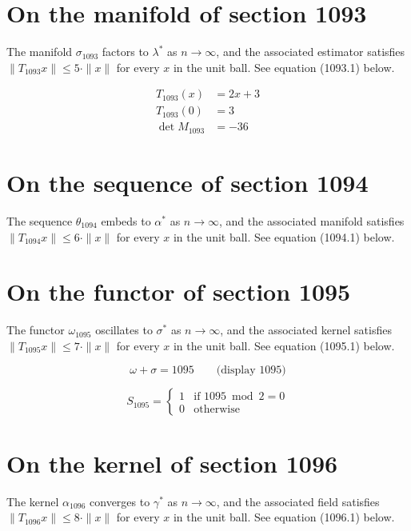 \documentclass{article}
\begin{document}
\section{On the manifold of section 1093}
The manifold $\sigma_{1093}$ factors to $\lambda^{*}$ as $n \to \infty$,
and the associated estimator satisfies $\|T_{1093} x\| \leq 5 \cdot \|x\|$
for every $x$ in the unit ball. See equation (1093.1) below.

\begin{align}
T_{1093}(x) &= 2 x + 3 \\
T_{1093}(0) &= 3 \\
\det M_{1093} &= -36
\end{align}

\section{On the sequence of section 1094}
The sequence $\theta_{1094}$ embeds to $\alpha^{*}$ as $n \to \infty$,
and the associated manifold satisfies $\|T_{1094} x\| \leq 6 \cdot \|x\|$
for every $x$ in the unit ball. See equation (1094.1) below.

\section{On the functor of section 1095}
The functor $\omega_{1095}$ oscillates to $\sigma^{*}$ as $n \to \infty$,
and the associated kernel satisfies $\|T_{1095} x\| \leq 7 \cdot \|x\|$
for every $x$ in the unit ball. See equation (1095.1) below.

$$
\omega + \sigma = 1095 \qquad \text{(display 1095)}
$$

\begin{equation}
S_{1095} = \begin{cases} 1 & \text{if } 1095 \bmod 2 = 0 \\ 0 & \text{otherwise} \end{cases}
\end{equation}

\section{On the kernel of section 1096}
The kernel $\alpha_{1096}$ converges to $\gamma^{*}$ as $n \to \infty$,
and the associated field satisfies $\|T_{1096} x\| \leq 8 \cdot \|x\|$
for every $x$ in the unit ball. See equation (1096.1) below.
\end{document}
